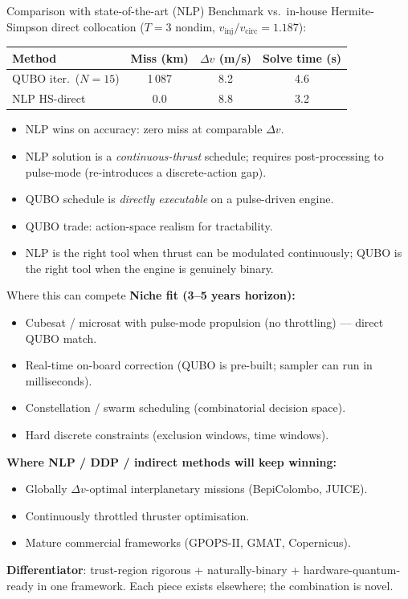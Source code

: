 \documentclass[10pt,aspectratio=169]{beamer}
\begin{document}
\begin{frame}{Comparison with state-of-the-art (NLP)}
Benchmark vs.\ in-house Hermite-Simpson direct collocation
($T = 3$ nondim, $v_\mathrm{inj}/v_\mathrm{circ} = 1.187$):

\medskip
\centering
\begin{tabular}{lccc}
\toprule
Method & Miss (km) & $\Delta v$ (m/s) & Solve time (s) \\
\midrule
QUBO iter.\ ($N = 15$) & 1\,087  & 8.2 & 4.6 \\
NLP HS-direct & 0.0 & 8.8 & 3.2 \\
\bottomrule
\end{tabular}

\medskip
\begin{itemize}[itemsep=3pt]
  \item NLP wins on accuracy: zero miss at comparable $\Delta v$.
  \item NLP solution is a \emph{continuous-thrust} schedule;
    requires post-processing to pulse-mode (re-introduces a
    discrete-action gap).
  \item QUBO schedule is \emph{directly executable} on a
    pulse-driven engine.
  \item QUBO trade: action-space realism for tractability.
  \item NLP is the right tool when thrust can be modulated
    continuously; QUBO is the right tool when the engine is
    genuinely binary.
\end{itemize}
\end{frame}

\begin{frame}{Where this can compete}
\textbf{Niche fit (3--5 years horizon):}
\begin{itemize}[itemsep=3pt]
  \item Cubesat / microsat with pulse-mode propulsion (no
    throttling) --- direct QUBO match.
  \item Real-time on-board correction (QUBO is pre-built; sampler
    can run in milliseconds).
  \item Constellation / swarm scheduling (combinatorial decision
    space).
  \item Hard discrete constraints (exclusion windows, time
    windows).
\end{itemize}

\medskip
\textbf{Where NLP / DDP / indirect methods will keep winning:}
\begin{itemize}[itemsep=3pt]
  \item Globally $\Delta v$-optimal interplanetary missions
    (BepiColombo, JUICE).
  \item Continuously throttled thruster optimisation.
  \item Mature commercial frameworks (GPOPS-II, GMAT, Copernicus).
\end{itemize}

\medskip
\textbf{Differentiator}: trust-region rigorous + naturally-binary +
hardware-quantum-ready in one framework. Each piece exists
elsewhere; the combination is novel.
\end{frame}
\end{document}
